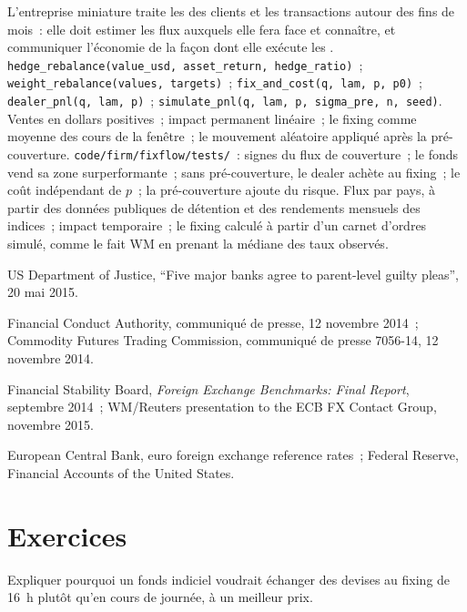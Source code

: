 \begin{build}
 L'entreprise miniature traite les  des clients et les transactions
autour des fins de mois~: elle doit estimer les flux auxquels elle fera face et connaître, et
communiquer l'économie de la façon dont elle exécute les .  \texttt{hedge\_rebalance(value\_usd, asset\_return,
hedge\_ratio)}~; \texttt{weight\_rebalance(values, targets)}~;
\texttt{fix\_and\_cost(q, lam, p, p0)}~; \texttt{dealer\_pnl(q, lam, p)}~;
\texttt{simulate\_pnl(q, lam, p, sigma\_pre, n, seed)}.
 Ventes en dollars positives~; impact permanent linéaire~; le fixing comme
moyenne des cours de la fenêtre~; le mouvement aléatoire appliqué après la pré-couverture.
 \texttt{code/firm/fixflow/tests/}~: signes du flux
de couverture~; le fonds vend sa zone surperformante~; sans pré-couverture, le dealer achète
au fixing~; le coût indépendant de $p$~; la pré-couverture ajoute du risque.
 Flux par pays, à partir des données publiques de détention et des
rendements mensuels des indices~; impact temporaire~; le fixing calculé à partir d'un carnet d'ordres simulé, comme le fait WM
en prenant la médiane des taux observés.
\end{build}

\begin{omsources}
\item US Department of Justice, ``Five major banks agree to parent-level guilty
pleas'', 20 mai 2015.
\item Financial Conduct Authority, communiqué de presse, 12 novembre 2014~; Commodity
Futures Trading Commission, communiqué de presse 7056-14, 12 novembre 2014.
\item Financial Stability Board, \emph{Foreign Exchange Benchmarks: Final
Report}, septembre 2014~; WM/Reuters presentation to the ECB FX Contact Group,
novembre 2015.
\item European Central Bank, euro foreign exchange reference rates~; Federal Reserve, Financial Accounts of the United States.
\end{omsources}

\section{Exercices}

\begin{exercise}[$\star$]\label{exo:m2:fixings-and-flows:1}
Expliquer pourquoi un fonds indiciel voudrait échanger des devises au fixing de 16~h
plutôt qu'en cours de journée, à un meilleur prix.
\end{exercise}

